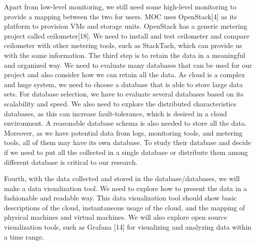 \documentclass[11pt, oneside]{article}   	%
\begin{document}
	Apart from low-level monitoring, we still need some high-level monitoring to provide a mapping between the two for users. MOC uses OpenStack[4] as its platform to provision VMs and storage units. OpenStack has a generic metering project called ceilometer[18]. We need to install and test ceilometer and compare ceilometer with other metering tools, such as StackTach, which can provide us with the same information. 
	The third step is to retain the data in a meaningful and organized way. We need to evaluate many databases that can be used for our project and also consider how we can retain all the data. As cloud is a complex and huge system, we need to choose a database that is able to store large data sets. For database selection, we have to evaluate several databases based on its scalability and speed. We also need to explore the distributed characteristics databases, as this can increase fault-tolerance, which is desired in a cloud environment. A reasonable database schema is also needed to store all the data. Moreover, as we have potential data from logs, monitoring tools, and metering tools, all of them may have its own database. To study their database and decide if we need to put all the collected in a single database or distribute them among different database is critical to our research. 
	
	Fourth, with the data collected and stored in the database/databases, we will make a data visualization tool. We need to explore how to present the data in a fashionable and readable way. This data visualization tool should show basic descriptions of the cloud, instantaneous usage of the cloud, and the mapping of physical machines and virtual machines. We will also explore open source visualization tools, such as Grafana [14] for visualizing and analyzing data within a time range. 
\end{document}
